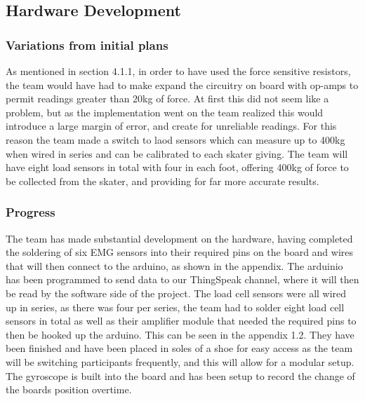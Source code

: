 \subsection{Hardware Development}
\subsubsection{Variations from initial plans}
As mentioned in section 4.1.1, in order to have used the force sensitive resistors, the team would have had to make expand the circuitry on board with op-amps to permit readings greater than 20kg of force. At first this did not seem like a problem, but as the implementation went on the team realized this would introduce a large margin of error, and create for unreliable readings. For this reason the team made a switch to laod sensors which can measure up to 400kg when wired in series and can be calibrated to each skater giving. The team will have eight load sensors in total with four in each foot, offering 400kg of force to be collected from the skater, and providing for far more accurate results.
\subsubsection{Progress}
The team has made substantial development on the hardware, having completed the soldering of six EMG sensors into their required pins on the board and wires that will then connect to the arduino, as shown in the appendix. The arduinio has been programmed to send data to our ThingSpeak channel, where it will then be read by the software side of the project. The load cell sensors were all wired up in series, as there was four per series, the team had to solder eight load cell sensors in total as well as their amplifier module that needed the required pins to then be hooked up the arduino. This can be seen in the appendix 1.2. They have been finished and have been placed in soles of a shoe for easy access as the team will be switching participants frequently, and this will allow for a modular setup. The gyroscope is built into the board and has been setup to record the change of the boards position overtime.   
